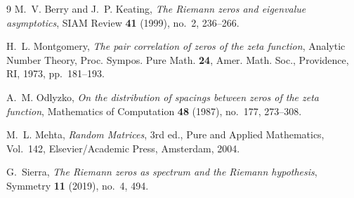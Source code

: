 \documentclass[11pt,a4paper]{article}
\begin{document}
\begin{thebibliography}{9}
M.~V. Berry and J.~P. Keating, \emph{The Riemann zeros and eigenvalue asymptotics}, SIAM Review \textbf{41} (1999), no.~2, 236--266.

H.~L. Montgomery, \emph{The pair correlation of zeros of the zeta function}, Analytic Number Theory, Proc. Sympos. Pure Math. \textbf{24}, Amer. Math. Soc., Providence, RI, 1973, pp.~181--193.

A.~M. Odlyzko, \emph{On the distribution of spacings between zeros of the zeta function}, Mathematics of Computation \textbf{48} (1987), no.~177, 273--308.

M.~L. Mehta, \emph{Random Matrices}, 3rd ed., Pure and Applied Mathematics, Vol.~142, Elsevier/Academic Press, Amsterdam, 2004.

G.~Sierra, \emph{The Riemann zeros as spectrum and the Riemann hypothesis}, Symmetry \textbf{11} (2019), no.~4, 494.
\end{thebibliography}
\end{document}
